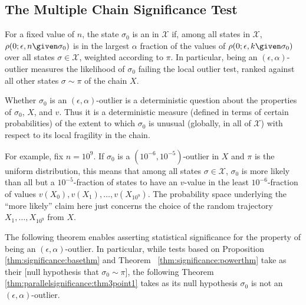 \documentclass[12pt]{article}
\begin{document}
\subsection*{The Multiple Chain Significance Test}

\begin{definition}
    For a fixed value of \( n \), the state \( \sigma_0 \) is an  in \( \mathcal{X} \) if, among all
    states in \( \mathcal{X} \), \( \rho(0; \epsilon, n \given \sigma_{0})
    \) is in the largest \( \alpha \) fraction of the values of \( \rho(0;
    \epsilon, k \given \sigma_{0}) \) over all states \( \sigma \in
    \mathcal{X} \), weighted according to \( \pi \).  In particular,
    being an \( (\epsilon, \alpha) \)-outlier measures the likelihood of
    \( \sigma_0 \) failing the local outlier test, ranked against all
    other states \( \sigma \sim \pi \) of the chain \( X \).
\end{definition}

Whether \( \sigma_0 \) is an \( (\epsilon, \alpha) \)-outlier is a
deterministic question about the properties of \( \sigma_0 \), \( X \),
and \( v \).  Thus it is a deterministic measure (defined in terms of
certain probabilities) of the extent to which \( \sigma_0 \) is unusual
(globally, in all of \( \mathcal{X} \)) with respect to its local
fragility in the chain.

\begin{example}
    For example, fix \( n = 10^9 \).  If \( \sigma_0 \) is a \( (10^{-6},
    10^{-5}) \)-outlier in \( X \) and \( \pi \) is the uniform
    distribution, this means that among all states \( \sigma \in
    \mathcal{X} \), \( \sigma_0 \) is more likely than all but a \( 10^{-5}
    \)-fraction of states to have an \( v \)-value in the least \( 10^{-6}
    \)-fraction of values \( v(X_0), v(X_1 ), \dots , v(X_{10^9} ) \).
    The probability space underlying the ``more likely'' claim here just
    concerns the choice of the random trajectory \( X_1, \dots, X_{10^9}
    \) from \( X \).
\end{example}

The following theorem enables asserting statistical significance for the
property of being an \( (\epsilon, \alpha) \)-outlier.  In particular,
while tests based on Proposition~%
\ref{thm:significance:basethm} and Theorem~%
\ref{thm:significance:powerthm} take as their [null hypothesis that \(
\sigma_0 \sim \pi \)], the following Theorem~%
\ref{thm:parallelsignificance:thm3point1} takes as its null hypothesis \(
\sigma_{0} \) is not an \( (\epsilon, \alpha) \)-outlier.
\end{document}
